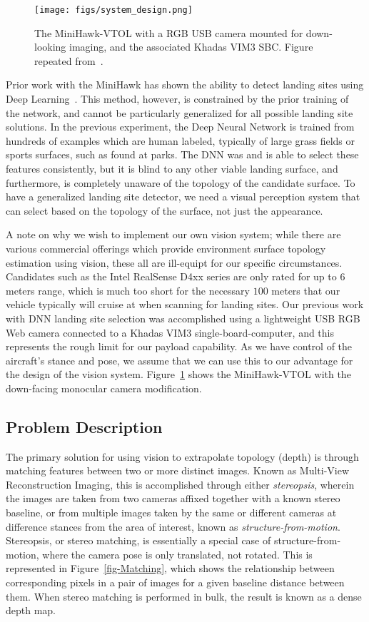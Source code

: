 \documentclass[runningheads]{llncs}
\begin{document}
\begin{figure}
\texttt{[image: figs/system\_design.png]}
\caption{The MiniHawk-VTOL with a RGB USB camera mounted for down-looking imaging, and the associated Khadas VIM3 SBC. Figure repeated from~\cite{arora2022deep}.} \label{fig-SystemCameraKhadas}
\end{figure}

Prior work with the MiniHawk has shown the ability to detect landing sites using Deep Learning~\cite{arora2022deep}. This method, however, is constrained by the prior training of the network, and cannot be particularly generalized for all possible landing site solutions. In the previous experiment, the Deep Neural Network is trained from hundreds of examples which are human labeled, typically of large grass fields or sports surfaces, such as found at parks. The DNN was and is able to select these features consistently, but it is blind to any other viable landing surface, and furthermore, is completely unaware of the topology of the candidate surface. To have a generalized landing site detector, we need a visual perception system that can select based on the topology of the surface, not just the appearance.

A note on why we wish to implement our own vision system; while there are various commercial offerings which provide environment surface topology estimation using vision, these all are ill-equipt for our specific circumstances. Candidates such as the Intel RealSense D4xx series are only rated for up to $6$ meters range, which is much too short for the necessary $100$ meters that our vehicle typically will cruise at when scanning for landing sites. Our previous work with DNN landing site selection was accomplished using a lightweight USB RGB Web camera connected to a Khadas VIM3 single-board-computer, and this represents the rough limit for our payload capability. As we have control of the aircraft's stance and pose, we assume that we can use this to our advantage for the design of the vision system. Figure~\ref{fig-SystemCameraKhadas} shows the MiniHawk-VTOL with the down-facing monocular camera modification.


\subsection{Problem Description}
The primary solution for using vision to extrapolate topology (depth) is through matching features between two or more distinct images. Known as Multi-View Reconstruction Imaging, this is accomplished through either \emph{stereopsis}, wherein the images are taken from two cameras affixed together with a known stereo baseline, or from multiple images taken by the same or different cameras at difference stances from the area of interest, known as \emph{structure-from-motion}. Stereopsis, or stereo matching, is essentially a special case of structure-from-motion, where the camera pose is only translated, not rotated. This is represented in Figure~\ref{fig-Matching}, which shows the relationship between corresponding pixels in a pair of images for a given baseline distance between them. When stereo matching is performed in bulk, the result is known as a dense depth map.
\end{document}
